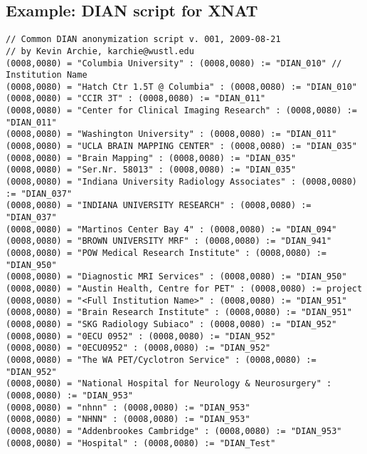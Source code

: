 \documentclass{beamer}  %
\begin{document}
\subsection{Example: DIAN script for XNAT}
\begin{frame}[fragile]
\tiny
\begin{verbatim}
// Common DIAN anonymization script v. 001, 2009-08-21
// by Kevin Archie, karchie@wustl.edu
(0008,0080) = "Columbia University" : (0008,0080) := "DIAN_010" // Institution Name
(0008,0080) = "Hatch Ctr 1.5T @ Columbia" : (0008,0080) := "DIAN_010" 
(0008,0080) = "CCIR 3T" : (0008,0080) := "DIAN_011" 
(0008,0080) = "Center for Clinical Imaging Research" : (0008,0080) := "DIAN_011" 
(0008,0080) = "Washington University" : (0008,0080) := "DIAN_011" 
(0008,0080) = "UCLA BRAIN MAPPING CENTER" : (0008,0080) := "DIAN_035" 
(0008,0080) = "Brain Mapping" : (0008,0080) := "DIAN_035" 
(0008,0080) = "Ser.Nr. 58013" : (0008,0080) := "DIAN_035"
(0008,0080) = "Indiana University Radiology Associates" : (0008,0080) := "DIAN_037" 
(0008,0080) = "INDIANA UNIVERSITY RESEARCH" : (0008,0080) := "DIAN_037" 
(0008,0080) = "Martinos Center Bay 4" : (0008,0080) := "DIAN_094" 
(0008,0080) = "BROWN UNIVERSITY MRF" : (0008,0080) := "DIAN_941" 
(0008,0080) = "POW Medical Research Institute" : (0008,0080) := "DIAN_950"
(0008,0080) = "Diagnostic MRI Services" : (0008,0080) := "DIAN_950"
(0008,0080) = "Austin Health, Centre for PET" : (0008,0080) := project 
(0008,0080) = "<Full Institution Name>" : (0008,0080) := "DIAN_951"
(0008,0080) = "Brain Research Institute" : (0008,0080) := "DIAN_951"
(0008,0080) = "SKG Radiology Subiaco" : (0008,0080) := "DIAN_952"
(0008,0080) = "0ECU 0952" : (0008,0080) := "DIAN_952"
(0008,0080) = "0ECU0952" : (0008,0080) := "DIAN_952"
(0008,0080) = "The WA PET/Cyclotron Service" : (0008,0080) := "DIAN_952"
(0008,0080) = "National Hospital for Neurology & Neurosurgery" : (0008,0080) := "DIAN_953"
(0008,0080) = "nhnn" : (0008,0080) := "DIAN_953"
(0008,0080) = "NHNN" : (0008,0080) := "DIAN_953"
(0008,0080) = "Addenbrookes Cambridge" : (0008,0080) := "DIAN_953"
(0008,0080) = "Hospital" : (0008,0080) := "DIAN_Test"
\end{verbatim}
\end{frame}
\end{document}
